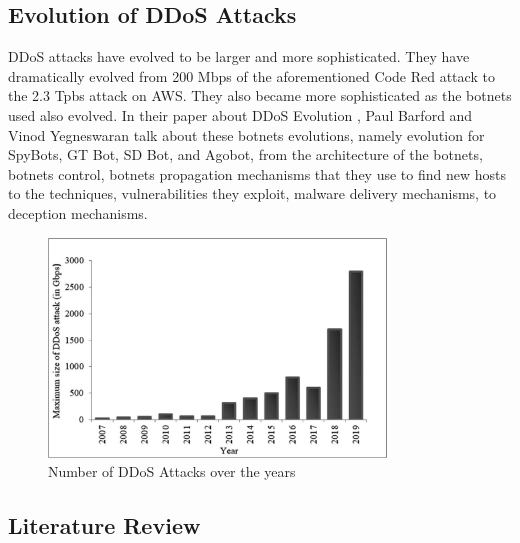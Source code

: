 \documentclass[a4paper, 12pt]{report} %
\begin{document}
        \subsection{Evolution of DDoS Attacks}
            DDoS attacks have evolved to be larger and more sophisticated. They have dramatically evolved from 200 Mbps \cite{ddos_evolution} of the aforementioned Code Red attack to the 2.3 Tpbs attack on AWS. They also became more sophisticated as the botnets used also evolved. In their paper about DDoS Evolution \cite{ddos_evolution}, Paul Barford and Vinod Yegneswaran talk about these botnets evolutions, namely evolution for SpyBots, GT Bot, SD Bot, and Agobot, from the architecture of the botnets, botnets control, botnets propagation mechanisms that they use to find new hosts to the techniques, vulnerabilities they exploit, malware delivery mechanisms, to deception mechanisms. 

            \begin{figure}[h!]
                \centering
                \includegraphics[width=0.8\textwidth]{Images/ddos_evolution.png}
                \caption{Number of DDoS Attacks over the years \cite{ebraryFundamentalsDDoS}}
                \label{fig:ddos_evolution}
            \end{figure}

            \subsection{Literature Review}
\end{document}
